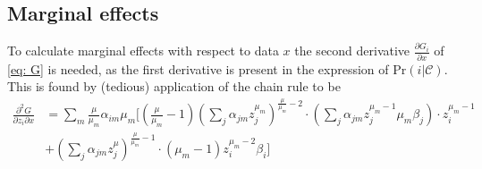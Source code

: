 \subsection{Marginal effects} \label{sec:marginalderivation}
To calculate marginal effects with respect to data $x$ the second derivative $\frac{\partial G_i}{\partial x}$ of \eqref{eq: G} is needed, as the first derivative is present in the expression of $\textrm{Pr}(i| \mathcal{C})$. This is found by (tedious) application of the chain rule to be
\begin{equation}
\begin{split}
  \frac{\partial^2 G}{\partial z_i \partial x} &= \sum_m \frac{\mu}{\mu_m}  \alpha_{im} \mu_m \bigg[
  \left( \frac{\mu}{\mu_m} - 1 \right) \left( \sum_j \alpha_{jm} z_j^{\mu_m} \right)^{\frac{\mu}{\mu_m} - 2} \cdot \left( \sum_j \alpha_{jm} z_j^{\mu_m - 1} \mu_m \beta_j \right) \cdot
 z_i^{\mu_m -1}
  \\
  & +
 \left( \sum_j \alpha_{jm} z_j^{\mu} \right)^{\frac{\mu}{\mu_m} - 1}  \cdot
  (\mu_m - 1) z_i^{\mu_m-2}\beta_i
  \bigg]
\end{split}
\end{equation}


